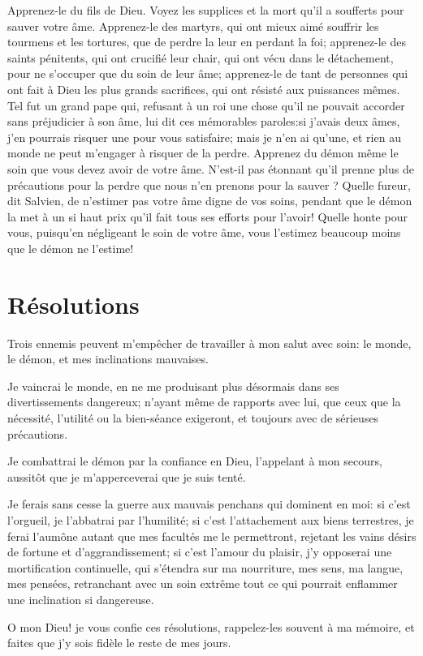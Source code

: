 \documentclass[instructions.tex]{subfiles}
\begin{document}
Apprenez-le du fils de Dieu. Voyez les supplices et la mort qu'il a soufferts pour sauver votre âme. Apprenez-le des martyrs, qui ont mieux aimé souffrir les tourmens et les tortures, que de perdre la leur en perdant la foi; apprenez-le des saints pénitents, qui ont crucifié leur chair, qui ont vécu dans le détachement, pour ne s'occuper que du soin de leur âme; apprenez-le de tant de personnes qui ont fait à Dieu les plus grands sacrifices, qui ont résisté aux puissances mêmes. Tel fut un grand pape qui, refusant à un roi une chose qu'il ne pouvait accorder sans préjudicier à son âme, lui dit ces mémorables paroles:\og si j'avais deux âmes, j'en pourrais risquer une pour vous satisfaire; mais je n'en ai qu'une, et rien au monde ne peut m'engager à risquer de la perdre\fg. Apprenez du démon même le soin que vous devez avoir de votre âme. N'est-il pas étonnant qu'il prenne plus de précautions pour la perdre que nous n'en prenons pour la sauver ? Quelle fureur, dit Salvien, de n'estimer pas votre âme digne de vos soins, pendant que le démon la met à un si haut prix qu'il fait tous ses efforts pour l'avoir! Quelle honte pour vous, puisqu'en négligeant le soin de votre âme, vous l'estimez beaucoup moins que le démon ne l'estime!

\section{Résolutions}

Trois ennemis peuvent m'empêcher de travailler à mon salut avec soin: le monde, le démon, et mes inclinations mauvaises. 

\primo Je vaincrai le monde, en ne me produisant plus désormais dans ses divertissements dangereux; n'ayant même de rapports avec lui, que ceux que la nécessité, l'utilité ou la bien-séance exigeront, et toujours avec de sérieuses précautions.

\secundo Je combattrai le démon par la confiance en Dieu, l'appelant à mon secours, aussitôt que je m'apperceverai que je suis tenté.

\tertio Je ferais sans cesse la guerre aux mauvais penchans qui dominent en moi: si c'est l'orgueil, je l'abbatrai par l'humilité; si c'est l'attachement aux biens terrestres, je ferai l'aumône autant que mes facultés me le permettront, rejetant les vains désirs de fortune et d'aggrandissement; si c'est l'amour du plaisir, j'y opposerai une mortification continuelle, qui s'étendra sur ma nourriture, mes sens, ma langue, mes pensées, retranchant avec un soin extrême tout ce qui pourrait enflammer une inclination si dangereuse. 

O mon Dieu! je vous confie ces résolutions, rappelez-les souvent à ma mémoire, et faites que j'y sois fidèle le reste de mes jours.
\end{document}

